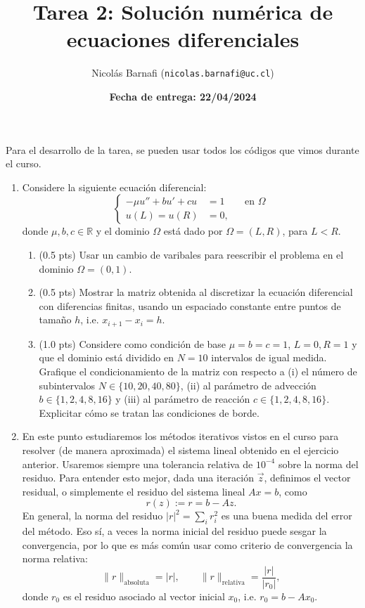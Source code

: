 \documentclass{article}
\title{Tarea 2: Solución numérica de ecuaciones diferenciales}
\author{Nicolás Barnafi (\texttt{nicolas.barnafi@uc.cl})}
\date{\textbf{Fecha de entrega: 22/04/2024}}
\begin{document}
\maketitle

Para el desarrollo de la tarea, se pueden usar todos los códigos que vimos durante el curso.

\begin{enumerate}
    \item Considere la siguiente ecuación diferencial: 
        $$
            \left\lbrace\begin{aligned}
                - \mu u'' + b u' + c u &= 1 && \text{en $\Omega$}\\
                u(L) = u(R) &= 0,
            \end{aligned}\right.
        $$
        donde $\mu, b,c\in \mathbb R$ y el dominio $\Omega$ está dado por $\Omega = (L, R)$, para $ L < R$. 
        \begin{enumerate}
            \item (0.5 pts) Usar un cambio de varibales para reescribir el problema en el dominio $\Omega = (0,1)$.
            \item (0.5 pts) Mostrar la matriz obtenida al discretizar la ecuación diferencial con diferencias finitas, usando un espaciado constante entre puntos de tamaño $h$, i.e. $x_{i+1} - x_i = h$.
            \item (1.0 pts) Considere como condición de base $\mu=b=c=1$, $L=0, R=1$ y que el dominio está dividido en $N=10$ intervalos de igual medida. Grafique el condicionamiento de la matriz con respecto a (i) el número de subintervalos $N\in \{10,20,40,80\}$, (ii) al parámetro de advección $b \in\{1, 2, 4, 8, 16\}$ y (iii) al parámetro de reacción $c\in\{1, 2, 4, 8, 16\}$. Explicitar cómo se tratan las condiciones de borde.
        \end{enumerate} 

    \item En este punto estudiaremos los métodos iterativos vistos en el curso para resolver (de manera aproximada) el sistema lineal obtenido en el ejercicio anterior. Usaremos siempre una tolerancia relativa de $10^{-4}$ sobre la norma del residuo. Para entender esto mejor, dada una iteración $\vec z$, definimos el vector residual, o simplemente el residuo del sistema lineal $Ax = b$, como 
            $$ r(z) := r = b - Az. $$
    En general, la norma del residuo $|r|^2 = \sum_i r_i^2$ es una buena medida del error del método. Eso sí, a veces la norma inicial del residuo puede sesgar la convergencia, por lo que es más común usar como criterio de convergencia la norma relativa: 
        $$ \|r\|_\text{absoluta} = |r|, \qquad \|r\|_\text{relativa} = \frac{|r|}{|r_0|}, $$
    donde $r_0$ es el residuo asociado al vector inicial $x_0$, i.e. $r_0 = b - Ax_0$. 


\end{enumerate}
\end{document}
